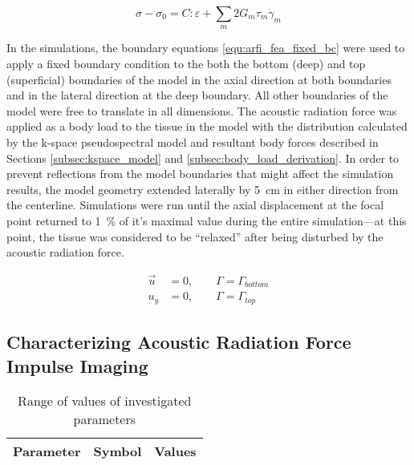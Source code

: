 			\begin{equation}
				\label{fea:time_deformation_visco}
				\sigma - \sigma_0 = C : \varepsilon + \sum_m 2 G_m \tau_m \dot{\gamma}_m 
			\end{equation}

			In the simulations, the boundary equations \ref{equ:arfi_fea_fixed_bc} were used to apply a fixed boundary condition to the both the bottom (deep) and top (superficial) boundaries of the model in the axial direction at both boundaries and in the lateral direction at the deep boundary. All other boundaries of the model were free to translate in all dimensions. The acoustic radiation force was applied as a body load to the tissue in the model with the distribution calculated by the k-space pseudospectral model and resultant body forces described in Sections \ref{subsec:kspace_model} and \ref{subsec:body_load_derivation}. In order to prevent reflections from the model boundaries that might affect the simulation results, the model geometry extended laterally by \SI{5}{\cm} in either direction from the centerline. Simulations were run until the axial displacement at the focal point returned to \SI{1}{\percent} of it's maximal value during the entire simulation---at this point, the tissue was considered to be ``relaxed'' after being disturbed by the acoustic radiation force.

			\begin{subequations}
				\label{equ:arfi_fea_fixed_bc}
				\begin{align}
					\vec{u} &= 0, \qquad \Gamma = \Gamma_{bottom} \\
					u_y &= 0, \qquad \Gamma = \Gamma_{top}
				\end{align}
			\end{subequations}

		\subsection{Characterizing Acoustic Radiation Force Impulse Imaging}

			\begin{table}[!htb]
				\centering
				\caption[ARFI model investigated parameters]{Range of values of investigated parameters}
				\label{tab:arfi-parametervalues}
				\begin{tabular}{lcc}
					\toprule
					Parameter & Symbol & Values \\
					\midrule
					\bottomrule
				\end{tabular}
			\end{table}

